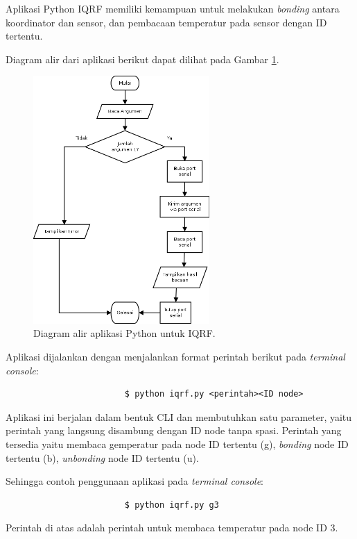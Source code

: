 				Aplikasi Python IQRF memiliki kemampuan untuk melakukan \emph{bonding} antara koordinator dan sensor, dan pembacaan temperatur pada sensor dengan ID tertentu.

				Diagram alir dari aplikasi berikut dapat dilihat pada Gambar \ref{python-iqrf}.

				\begin{figure}[H]
				  \centering
				    \includegraphics[width=0.6\textwidth]{gambar/python-iqrf}
				    \caption{Diagram alir aplikasi Python untuk IQRF.}
				    \label{python-iqrf}
				\end{figure}

				Aplikasi dijalankan dengan menjalankan format perintah berikut pada \emph{terminal console}:
				\begingroup
				    \fontsize{10pt}{12pt}\selectfont
				    \begin{verbatim}
						$ python iqrf.py <perintah><ID node>
				    \end{verbatim}  
				\endgroup

				Aplikasi ini berjalan dalam bentuk CLI dan membutuhkan satu parameter, yaitu perintah yang langsung disambung dengan ID node tanpa spasi. Perintah yang tersedia yaitu membaca gemperatur pada node ID tertentu (g), \emph{bonding} node ID tertentu (b), \emph{unbonding} node ID tertentu (u).

				Sehingga contoh penggunaan aplikasi pada \emph{terminal console}:
				\begingroup
				    \fontsize{10pt}{12pt}\selectfont
				    \begin{verbatim}
						$ python iqrf.py g3
				    \end{verbatim}  
				\endgroup
				Perintah di atas adalah perintah untuk membaca temperatur pada node ID 3.

